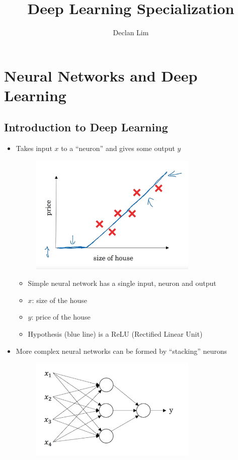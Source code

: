 \documentclass[12pt, letterpaper]{article}
\title{Deep Learning Specialization}
\author{Declan Lim}
\begin{document}
    \maketitle
    \pagebreak

    \section{Neural Networks and Deep Learning}
    \subsection{Introduction to Deep Learning}
    \begin{itemize}
        \item Takes input $x$ to a ``neuron'' and gives some output $y$   
        \begin{figure}[ht]
            \centering
            \includegraphics[width=8cm]{1.png}
        \end{figure}
        \begin{itemize}
            \item Simple neural network has a single input, neuron and output
            \item $x$: size of the house
            \item $y$: price of the house
            \item Hypothesis (blue line) is a ReLU (Rectified Linear Unit)
        \end{itemize}
        \item More complex neural networks can be formed by ``stacking'' neurons
        \begin{figure}[ht]
            \centering
            \includegraphics[width=8cm]{2.png}

\end{figure}
\end{itemize}
\end{document}
